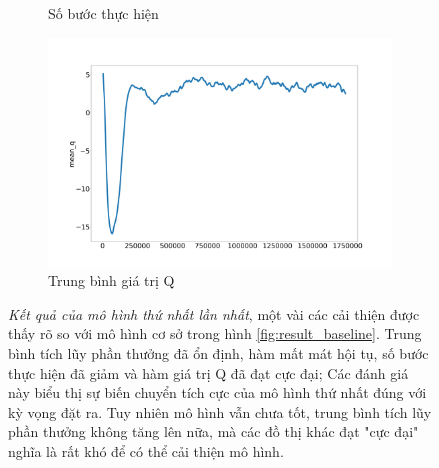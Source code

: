 \begin{figure}[hb]
\begin{subfigure}{.5\textwidth}
      \caption{Số bước thực hiện}
      \label{fig:first_mode:try_1:step}
    \end{subfigure}%
    \begin{subfigure}{.5\textwidth}
      \includegraphics[width=1.1\textwidth]{Pic/First_model/mean_q.png}
      \caption{Trung bình giá trị Q}
      \label{fig:first_model:try1:mean_q}
    \end{subfigure}
\caption[Kết quả của mô hình thứ nhất lần nhất]{\textit{Kết quả của mô hình thứ nhất lần nhất}, một vài các cải thiện được thấy rõ so với mô hình cơ sở trong hình \ref{fig:result_baseline}. Trung bình tích lũy phần thưởng đã ổn định, hàm mất mát hội tụ, số bước thực hiện đã giảm và hàm giá trị Q đã đạt cực đại; Các đánh giá này biểu thị sự biến chuyển tích cực của mô hình thứ nhất đúng với kỳ vọng đặt ra. Tuy nhiên mô hình vẫn chưa tốt, trung bình tích lũy phần thưởng không tăng lên nữa, mà các đồ thị khác đạt "cực đại" nghĩa là rất khó để có thể cải thiện mô hình.}
\label{fig:result_first_model:try_1}
\end{figure}
\vspace{1cm}
